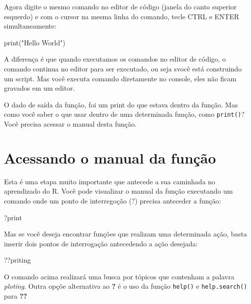 \documentclass[
]{book}
\newenvironment{Shaded}{\begin{snugshade}}{\end{snugshade}}
\newcommand{\FunctionTok}[1]{\textcolor[rgb]{0.00,0.00,0.00}{#1}}
\newcommand{\NormalTok}[1]{#1}
\newcommand{\StringTok}[1]{\textcolor[rgb]{0.31,0.60,0.02}{#1}}
\begin{document}
Agora digite o mesmo comando no editor de código (janela do canto superior esquerdo) e com o cursor na mesma linha do comando, tecle CTRL e ENTER simultaneamente:

\begin{Shaded}
\begin{Highlighting}[]
\FunctionTok{print}\NormalTok{(}\StringTok{"Hello World"}\NormalTok{)}
\end{Highlighting}
\end{Shaded}

A diferença é que quando executamos os comandos no editor de código, o comando continua no editor para ser executado, ou seja svocê está construindo um script. Mas você executa comando diretamente no console, eles não ficam gravados em um editor.

O dado de saída da função, foi um print do que estava dentro da função. Mas como você saber o que usar dentro de uma determinada função, como \texttt{print()}? Você precisa acessar o manual desta função.

\hypertarget{acessando-o-manual-da-funuxe7uxe3o}{%
\section{Acessando o manual da função}\label{acessando-o-manual-da-funuxe7uxe3o}}

Esta é uma etapa muito importante que antecede a sua caminhada no aprendizado do R. Você pode visualizar o manual da função executando um comando onde um ponto de interregoção (?) precisa anteceder a função:

\begin{Shaded}
\begin{Highlighting}[]
\NormalTok{?print}
\end{Highlighting}
\end{Shaded}

Mas se você deseja encontrar funções que realizam uma determinada ação, basta inserir dois pontos de interrogação antecedendo a ação desejada:

\begin{Shaded}
\begin{Highlighting}[]
\NormalTok{??priting}
\end{Highlighting}
\end{Shaded}

O comando acima realizará uma busca por tópicos que contenham a palavra \emph{ploting}. Outra opçõe alternativa ao \textbf{?} é o uso da função \texttt{help()} e \texttt{help.search()} para \textbf{??}
\end{document}
